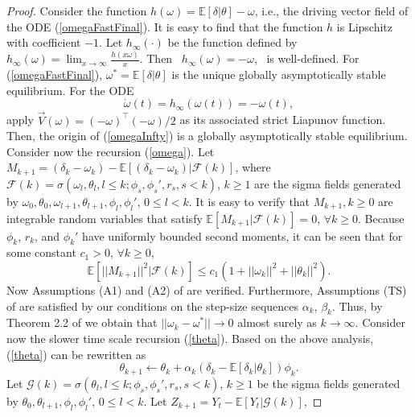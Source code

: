 \begin{proof}
 Consider the function $h(\omega)=\mathbb{E}[\delta|\theta]-\omega$,
 i.e., the driving vector field of the ODE (\ref{omegaFastFinal}).
 It is easy to find that the function $h$ is Lipschitz with coefficient
$-1$.
 Let $h_{\infty}(\cdot)$ be the function defined by
$h_{\infty}(\omega)=\lim_{x\rightarrow \infty}\frac{h(x\omega)}{x}$.
 Then  $h_{\infty}(\omega)= -\omega$,  is well-defined. 
 For (\ref{omegaFastFinal}), $\omega^*=\mathbb{E}[\delta|\theta]$
 is the unique globally asymptotically stable equilibrium.
 For the ODE
  \begin{equation}
 \dot{\omega}(t) = h_{\infty}(\omega(t))= -\omega(t),
 \label{omegaInfty}
 \end{equation}
 apply $\vec{V}(\omega)=(-\omega)^{\top}(-\omega)/2$ as its
 associated strict Liapunov function. Then,
 the origin of (\ref{omegaInfty}) is a globally asymptotically stable
 equilibrium. Consider now the recursion (\ref{omega}).
 Let $M_{k+1}=(\delta_k-\omega_k)
 -\mathbb{E}[(\delta_k-\omega_k)|\mathcal{F}(k)]$,
 where $\mathcal{F}(k)=\sigma(\omega_l,\theta_l,l\leq k;\phi_s,\phi_s',r_s,s<k)$, $k\geq 1$ are the sigma fields
 generated by $\omega_0,\theta_0,\omega_{l+1},\theta_{l+1},\phi_l,\phi_l'$, $0\leq l<k$.
 It is easy to verify that $M_{k+1},k\geq0$ are integrable random variables that 
 satisfy $\mathbb{E}[M_{k+1}|\mathcal{F}(k)]=0$, $\forall k\geq0$.
 Because $\phi_k$, $r_k$, and $\phi_k'$ have
 uniformly bounded second moments, it can be seen that for some constant $c_1>0$, $\forall k\geq0$,
\begin{equation*}
 \mathbb{E}[||M_{k+1}||^2|\mathcal{F}(k)]\leq
 c_1(1+||\omega_k||^2+||\theta_k||^2).
\end{equation*}
Now Assumptions (A1) and (A2) of \cite{borkar2000ode} are verified.
 Furthermore, Assumptions (TS) of \cite{borkar2000ode} are satisfied by our
 conditions on the step-size sequences $\alpha_k$, $\beta_k$. Thus,
 by Theorem 2.2 of \cite{borkar2000ode} we obtain that $||\omega_k-\omega^*||\rightarrow 0$ almost surely as $k\rightarrow \infty$.
Consider now the slower time scale recursion (\ref{theta}).
 Based on the above analysis, (\ref{theta}) can be rewritten as 
\begin{equation*}
\theta_{k+1}\leftarrow
\theta_{k}+\alpha_k(\delta_k-\mathbb{E}[\delta_k|\theta_k])\phi_k.
\end{equation*}
Let $\mathcal{G}(k)=\sigma(\theta_l,l\leq k;\phi_s,\phi_s',r_s,s<k)$, 
$k\geq 1$ be the sigma fields
 generated by $\theta_0,\theta_{l+1},\phi_l,\phi_l'$,
$0\leq l<k$.
 Let $Z_{k+1} = Y_{t}-\mathbb{E}[Y_{t}|\mathcal{G}(k)]$,

\end{proof}
